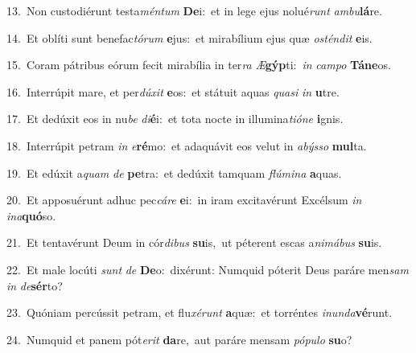 {\numbfont\textcolor{\numbcolor}{13.}}~Non custodiérunt testa\-\textit{mén}\-\textit{tum} \textbf{De}\-i:~\star et in lege ejus nolué\textit{runt} \textit{am}\-\textit{bu}\textbf{lá}re.\par
{\numbfont\textcolor{\numbcolor}{14.}}~Et oblíti sunt benefac\-\textit{tó}\-\textit{rum} \textbf{e}\-jus:~\star et mirabílium ejus quæ \textit{os}\-\textit{tén}\textit{dit} \textbf{e}\-is.\par
{\numbfont\textcolor{\numbcolor}{15.}}~Coram pátribus eórum fecit mirabília in ter\textit{ra} \textit{Æ}\-\textbf{gýp}ti:~\star \textit{in} \textit{cam}\-\textit{po} \textbf{Tá}\-\textbf{ne}os.\par
{\numbfont\textcolor{\numbcolor}{16.}}~Interrúpit mare, et per\-\textit{dú}\-\textit{xit} \textbf{e}\-os:~\star et státuit aquas \textit{qua}\-\textit{si} \textit{in} \textbf{u}\-tre.\par
{\numbfont\textcolor{\numbcolor}{17.}}~Et dedúxit eos in nu\textit{be} \textit{di}\-\textbf{é}i:~\star et tota nocte in illumina\-\textit{ti}\-\textit{ó}\textit{ne} \textbf{i}\-gnis.\par
{\numbfont\textcolor{\numbcolor}{18.}}~Interrúpit petram \textit{in} \textit{e}\-\textbf{ré}mo:~\star et adaquávit eos velut in \textit{a}\-\textit{býs}\textit{so} \textbf{mul}\-ta.\par
{\numbfont\textcolor{\numbcolor}{19.}}~Et edúxit a\textit{quam} \textit{de} \textbf{pe}\-tra:~\star et dedúxit tamquam \textit{flú}\-\textit{mi}\textit{na} \textbf{a}\-quas.\par
{\numbfont\textcolor{\numbcolor}{20.}}~Et apposuérunt adhuc pec\-\textit{cá}\-\textit{re} \textbf{e}\-i:~\star in iram excitavérunt Excélsum \textit{in} \textit{in}\-\textit{a}\textbf{quó}so.\par
{\numbfont\textcolor{\numbcolor}{21.}}~Et tentavérunt Deum in cór\-\textit{di}\-\textit{bus} \textbf{su}\-is,~\star ut péterent escas a\-\textit{ni}\-\textit{má}\textit{bus} \textbf{su}\-is.\par
{\numbfont\textcolor{\numbcolor}{22.}}~Et male locúti \textit{sunt} \textit{de} \textbf{De}\-o:~\star dixérunt: Numquid póterit Deus paráre men\textit{sam} \textit{in} \textit{de}\-\textbf{sér}to?\par
{\numbfont\textcolor{\numbcolor}{23.}}~Quóniam percússit petram, et flu\-\textit{xé}\-\textit{runt} \textbf{a}\-quæ:~\star et torréntes \textit{in}\-\textit{un}\textit{da}\textbf{vé}runt.\par
{\numbfont\textcolor{\numbcolor}{24.}}~Numquid et panem pót\-\textit{e}\-\textit{rit} \textbf{da}\-re,~\star aut paráre mensam \textit{pó}\-\textit{pu}\textit{lo} \textbf{su}\-o?\par
